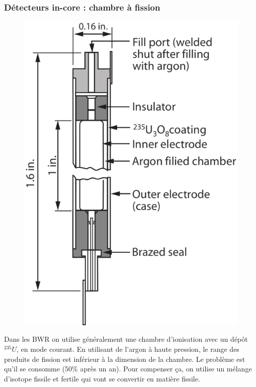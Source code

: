 \newpage
\subsubsection{Détecteurs in-core : chambre à fission}
	\begin{figure}
	\vspace{-5mm}
	\includegraphics[scale=0.15]{ch11/image5}
	\end{figure}
Dans les BWR on utilise généralement une chambre d'ionisation avec un dépôt $^{235}U$, en mode
courant. En utilisant de l'argon à haute pression, le range des produits de fission est inférieur
à la dimension de la chambre. Le problème est qu'il se consomme (50\% après un an). Pour compenser
ça, on utilise un mélange d'isotope fissile et fertile qui vont se convertir en matière fissile.\\
\ \\
\vspace{3mm}

